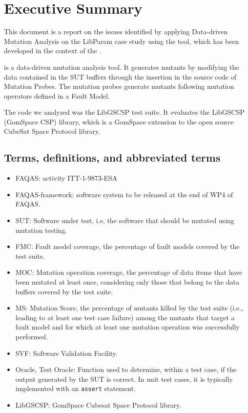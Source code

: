 
\chapter{Executive Summary}

This document is a report on the issues identified by applying Data-driven Mutation Analysis on the LibParam case study using the \DAMA tool, which has been developed in the context of the \FAQAS.

\DAMA is a data-driven mutation analysis tool. It generates mutants by modifying the data contained in the SUT buffers through the insertion in the source code of Mutation Probes. The mutation probes generate mutants following mutation operators defined in a Fault Model.

The code we analyzed was the LibGSCSP test suite. It evaluates the LibGSCSP (GomSpace CSP) library, which is a GomSpace extension to the open source CubeSat Space Protocol library.

\section{Terms, definitions, and abbreviated terms}

\begin{itemize}
\item{FAQAS}: activity ITT-1-9873-ESA
\item{FAQAS-framework}: software system to be released at the end of WP4 of FAQAS.
\item{SUT}: Software under test, i.e, the software that should be mutated using mutation testing.
\item{FMC}: Fault model coverage, the percentage of fault models covered by the test suite.
\item{MOC}: Mutation operation coverage, the percentage of data items that have been mutated at least once, considering only those that belong to the data buffers covered by the test suite.
\item{MS}: Mutation Score, the percentage of mutants killed by the test suite (i.e., leading to at least one test case failure) among the mutants that target a fault model and for which at least one mutation operation was successfully performed.
\item{SVF}: Software Validation Facility.
\item{Oracle, Test Oracle}: Function used to determine, within a test case, if the output generated by
the SUT is correct. In unit test cases, it is typically implemented with an \texttt{assert} statement.
\item{LibGSCSP}: GomSpace Cubesat Space Protocol library.

\end{itemize}

\clearpage
